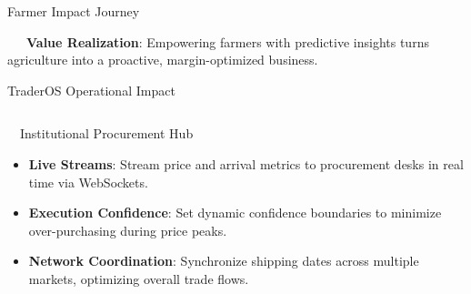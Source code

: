 \documentclass{beamer}
\begin{document}
\begin{frame}{Farmer Impact Journey}
\vspace{0.15cm}
\begin{tcolorbox}[enhanced, colback=primaryblue!4, colframe=primaryblue!30, boxrule=0.35pt,
  arc=3.5pt, width=0.98\textwidth, left=4pt, right=4pt, top=2.5pt, bottom=2.5pt, boxsep=0pt,
  halign=center, shadow={0.5pt}{-0.5pt}{0pt}{black!8}]
    \fontsize{5.5pt}{6.5pt}\selectfont
    \textcolor{primaryDark}{~~~\textbf{Value Realization}: Empowering farmers with predictive insights turns agriculture into a proactive, margin-optimized business.}
\end{tcolorbox}
\end{frame}

\begin{frame}{TraderOS Operational Impact}
\vspace{-0.2cm}

\begin{columns}[T]
    \begin{column}{0.48\textwidth}
        \begin{infocard}{~~Institutional Procurement Hub}
            \fontsize{6.8pt}{8.5pt}\selectfont
            \begin{itemize}\setlength\itemsep{4.5pt}\setlength\parskip{0pt}
                \item \textbf{Live Streams}: Stream price and arrival metrics to procurement desks in real time via WebSockets.
                \item \textbf{Execution Confidence}: Set dynamic confidence boundaries to minimize over-purchasing during price peaks.
                \item \textbf{Network Coordination}: Synchronize shipping dates across multiple markets, optimizing overall trade flows.
            \end{itemize}
        \end{infocard}
    \end{column}
    

\end{columns}
\end{frame}
\end{document}
